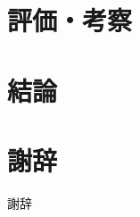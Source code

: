 \documentclass[12pt]{b-thesis}
\begin{document}
\chapter{評価・考察}
\label{chap:validation}


\chapter{結論}
\label{chap:conclusion}


\chapter*{謝辞}
{\protect\numberline {}謝辞}


\thispagestyle{plain}
%


\end{document}
